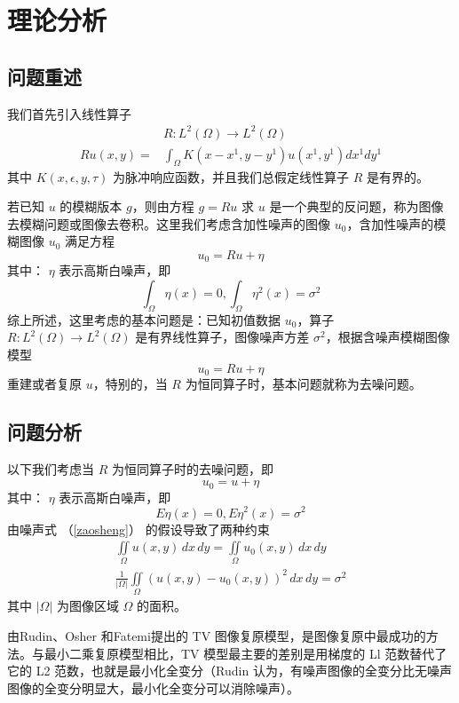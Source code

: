 \section{理论分析}
\subsection{问题重述}
我们首先引入线性算子
\begin{align*}
&R:L^2(\Omega) \longrightarrow L^2(\Omega) \\
Ru(x,y)=&\int_\Omega K(x-x^1,y-y^1)u(x^1,y^1)dx^1dy^1
\end{align*}
其中 $K(x,\epsilon,y,\tau)$ 为脉冲响应函数，并且我们总假定线性算子 $R$ 是有界的。

若已知 $u$ 的模糊版本 $g$，则由方程 $g=Ru$ 求 $u$ 是一个典型的反问题，称为图像去模糊问题或图像去卷积。这里我们考虑含加性噪声的图像 $u_0$，含加性噪声的模糊图像 $u_0$ 满足方程
\[u_0=Ru+\eta\]
其中： $\eta$ 表示高斯白噪声，即
\[\int_\Omega \eta(x)=0,\int_\Omega \eta^2(x)=\sigma^2\]
综上所述，这里考虑的基本问题是：已知初值数据 $u_0$，算子 $R:L^2(\Omega) \longrightarrow L^2(\Omega)$ 是有界线性算子，图像噪声方差 $\sigma^2$，根据含噪声模糊图像模型
\[u_0=Ru+\eta\]
重建或者复原 $u$，特别的，当 $R$ 为恒同算子时，基本问题就称为去噪问题。

\subsection{问题分析}
以下我们考虑当 $R$ 为恒同算子时的去噪问题，即
\begin{equation}
u_0=u+\eta
\end{equation}
其中： $\eta$ 表示高斯白噪声，即
\begin{equation}
\label{zaosheng}
E\eta(x)=0,E\eta^2(x)=\sigma^2
\end{equation}
由噪声式 （\ref{zaosheng}） 的假设导致了两种约束
\begin{align}
\iint\limits_\Omega u(x,y)\,dx\,dy =\iint\limits_\Omega u_0(x,y)\,dx\,dy\\
\frac{1}{|\Omega|}\iint\limits_\Omega (u(x,y)-u_0(x,y))^2\,dx\,dy =\sigma^2
\end{align}
其中 $|\Omega|$ 为图像区域 $\Omega$ 的面积。

由Rudin、Osher 和Fatemi提出的 TV 图像复原模型，是图像复原中最成功的方法。与最小二乘复原模型相比，TV 模型最主要的差别是用梯度的 Ll 范数替代了它的 L2 范数，也就是最小化全变分（Rudin 认为，有噪声图像的全变分比无噪声图像的全变分明显大，最小化全变分可以消除噪声）。

